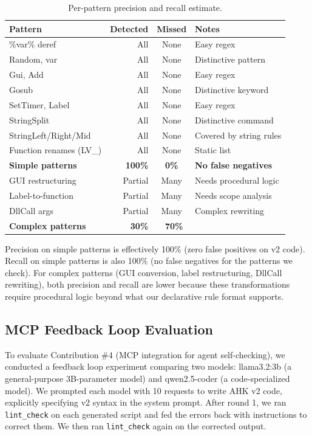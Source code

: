 \documentclass[11pt,a4paper]{article}
\begin{document}
\begin{enumerate}
\begin{table}[h]
\centering\small
\caption{Per-pattern precision and recall estimate.}
\label{tab:pr}
\begin{tabular}{lrcl}
\toprule
\textbf{Pattern} & \textbf{Detected} & \textbf{Missed} & \textbf{Notes} \\
\midrule
\%var\% deref & All & None & Easy regex \\
Random, var & All & None & Distinctive pattern \\
Gui, Add & All & None & Easy regex \\
Gosub & All & None & Distinctive keyword \\
SetTimer, Label & All & None & Easy regex \\
StringSplit & All & None & Distinctive command \\
StringLeft/Right/Mid & All & None & Covered by string rules \\
Function renames (LV\_) & All & None & Static list \\
\midrule
\textbf{Simple patterns} & \textbf{100\%} & \textbf{0\%} & \textbf{No false negatives} \\
\midrule
GUI restructuring & Partial & Many & Needs procedural logic \\
Label-to-function & Partial & Many & Needs scope analysis \\
DllCall args & Partial & Many & Complex rewriting \\
\midrule
\textbf{Complex patterns} & \textbf{~30\%} & \textbf{~70\%} & \\
\bottomrule
\end{tabular}
\end{table}

Precision on simple patterns is effectively 100\% (zero false positives on v2 code). Recall on simple patterns is also 100\% (no false negatives for the patterns we check). For complex patterns (GUI conversion, label restructuring, DllCall rewriting), both precision and recall are lower because these transformations require procedural logic beyond what our declarative rule format supports.

\subsection{MCP Feedback Loop Evaluation}

To evaluate Contribution \#4 (MCP integration for agent self-checking), we conducted a feedback loop experiment comparing two models: llama3.2:3b (a general-purpose 3B-parameter model) and qwen2.5-coder (a code-specialized model). We prompted each model with 10 requests to write AHK v2 code, explicitly specifying v2 syntax in the system prompt. After round 1, we ran \texttt{lint\_check} on each generated script and fed the errors back with instructions to correct them. We then ran \texttt{lint\_check} again on the corrected output.


\end{enumerate}
\end{document}
